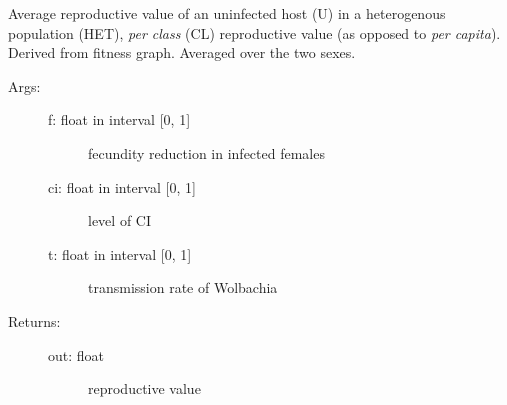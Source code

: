 \documentclass[letterpaper,10pt,english]{sphinxmanual}
\begin{document}
\begin{fulllineitems}
\label{index:wspec.analytical.reproval_UHETCL}
Average reproductive value of an uninfected host (U) in a 
heterogenous population (HET), \emph{per class} (CL) reproductive value 
(as opposed to \emph{per capita}). Derived from fitness graph. 
Averaged over the two sexes.
\begin{description}
\item[{Args:}] \leavevmode\begin{description}
\item[{f: float in interval {[}0, 1{]}}] \leavevmode
fecundity reduction in infected females

\item[{ci: float in interval {[}0, 1{]}}] \leavevmode
level of CI

\item[{t: float in interval {[}0, 1{]}}] \leavevmode
transmission rate of Wolbachia

\end{description}

\item[{Returns:}] \leavevmode\begin{description}
\item[{out: float}] \leavevmode
reproductive value

\end{description}

\end{description}

\end{fulllineitems}

\end{document}
